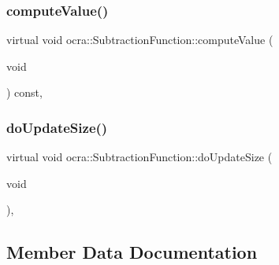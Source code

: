 \hypertarget{classocra_1_1SubtractionFunction_a4cdbb66a83d1113ecea252898ec1bda3}{}\label{classocra_1_1SubtractionFunction_a4cdbb66a83d1113ecea252898ec1bda3} 
\subsubsection{\texorpdfstring{compute\+Value()}{computeValue()}}
{\footnotesize\ttfamily virtual void ocra\+::\+Subtraction\+Function\+::compute\+Value (\begin{DoxyParamCaption}\item[{void}]{ }\end{DoxyParamCaption}) const\hspace{0.3cm}{\ttfamily [protected]}, {\ttfamily [virtual]}}

\hypertarget{classocra_1_1SubtractionFunction_abeccbd4ec6cabf7bf18169e052a993d5}{}\label{classocra_1_1SubtractionFunction_abeccbd4ec6cabf7bf18169e052a993d5} 
\subsubsection{\texorpdfstring{do\+Update\+Size()}{doUpdateSize()}}
{\footnotesize\ttfamily virtual void ocra\+::\+Subtraction\+Function\+::do\+Update\+Size (\begin{DoxyParamCaption}\item[{void}]{ }\end{DoxyParamCaption})\hspace{0.3cm}{\ttfamily [protected]}, {\ttfamily [virtual]}}



\subsection{Member Data Documentation}
\hypertarget{classocra_1_1SubtractionFunction_a2acdf28df1d3018d7c25cb8b16c879d1}{}\label{classocra_1_1SubtractionFunction_a2acdf28df1d3018d7c25cb8b16c879d1} 

